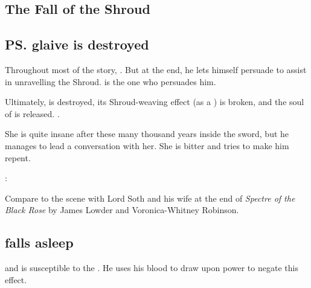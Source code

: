 \begin{garbage}
\section{The Fall of the Shroud}
\subsection{\ps{\Ishnaruchaefir} glaive is destroyed}
Throughout most of the story, . But at the end, he lets himself persuade to assist in unravelling the Shroud. \Triestessakhin{} is the one who persuades him. 

Ultimately,  is destroyed, its Shroud-weaving effect (as a ) is broken, and the soul of \Triestessakhin{} is released. 
. 

She is quite insane after these many thousand years inside the sword, but he manages to lead a conversation with her. She is bitter and tries to make him repent. 

\Ishna: 

Compare to the scene with Lord Soth and his wife at the end of \emph{Spectre of the Black Rose} by James Lowder and Voronica-Whitney Robinson. 



% 







\subsection{\Vizsherioch{} falls asleep}
\Vizsherioch{}  and is susceptible to the . He uses his \bane{} blood to draw upon \Erebean{} power to negate this effect. 


\end{garbage}
